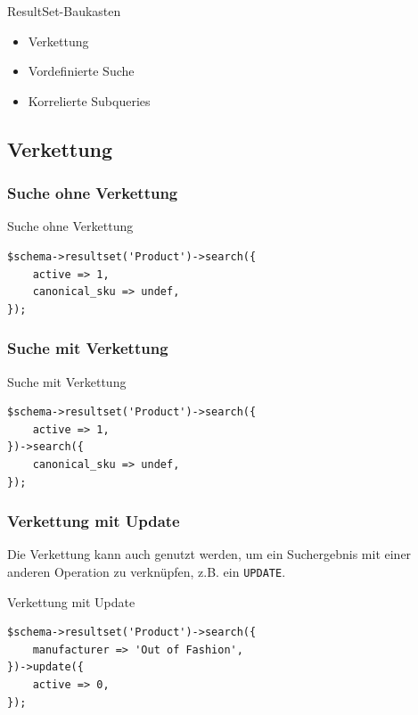 \begin{frame}{ResultSet-Baukasten}
\begin{itemize}
\item Verkettung
\item Vordefinierte Suche
\item Korrelierte Subqueries
\end{itemize}
\end{frame}

\subsection{Verkettung}

\subsubsection{Suche ohne Verkettung}

\begin{frame}[fragile]{Suche ohne Verkettung}
\begin{lstlisting}
$schema->resultset('Product')->search({
    active => 1,
    canonical_sku => undef,
});
\end{lstlisting}
\end{frame}

\subsubsection{Suche mit Verkettung}

\begin{frame}[fragile]{Suche mit Verkettung}
\begin{lstlisting}
$schema->resultset('Product')->search({
    active => 1,
})->search({
    canonical_sku => undef,
});
\end{lstlisting}
\end{frame}

\subsubsection{Verkettung mit Update}

Die Verkettung kann auch genutzt werden, um
ein Suchergebnis mit einer anderen Operation zu
verknüpfen, z.B. ein \verb|UPDATE|.

\begin{frame}[fragile]{Verkettung mit Update}
\begin{lstlisting}
$schema->resultset('Product')->search({
    manufacturer => 'Out of Fashion',
})->update({
    active => 0,
});
\end{lstlisting}
\end{frame}

